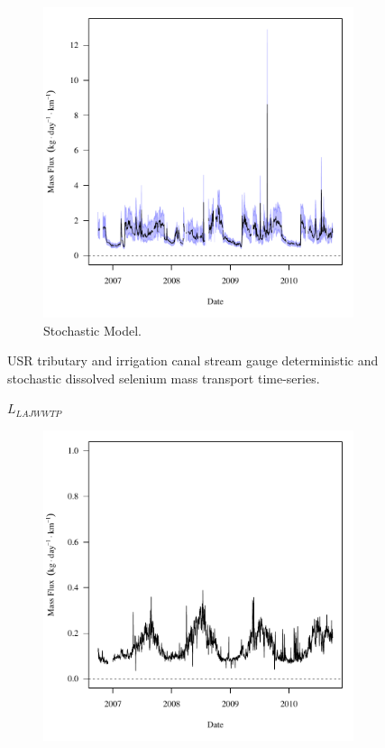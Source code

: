 \begin{linenumbers}
\begin{landscape}
\begin{figure}
\begin{subfigure}{0.7\textwidth}
			\includegraphics[width=\tableCustomSize]{"Figures/Results_USR/Stochastic/f TIM"}
			\caption{Stochastic Model.}
		\end{subfigure}
		\caption{USR tributary and irrigation canal stream gauge deterministic and stochastic dissolved selenium mass transport time-series.}
	\end{figure}
\end{landscape}
\subfiguremid
\begin{landscape}
	\begin{figure}
		$ \displaystyle L_{LAJWWTP} $
		\begin{subfigure}{0.7\textwidth}
			\centering
			\includegraphics[width=\tableCustomSize]{"Figures/Results_USR/Deterministic/f WTP"}

\end{subfigure}
\end{figure}
\end{landscape}
\end{linenumbers}
